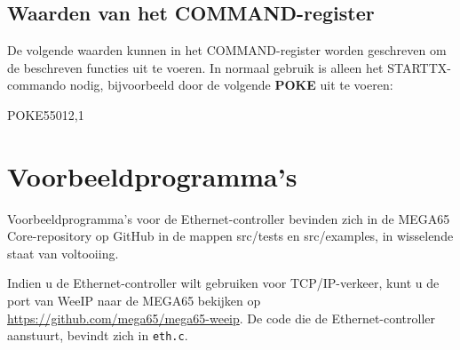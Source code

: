 \subsection{Waarden van het COMMAND-register}

De volgende waarden kunnen in het COMMAND-register worden geschreven om de beschreven functies uit te voeren. In normaal gebruik is alleen het STARTTX-commando nodig, bijvoorbeeld door de volgende {\bf POKE} uit te voeren:

\begin{screencode}
POKE55012,1
\end{screencode}



\section{Voorbeeldprogramma's}

Voorbeeldprogramma's voor de Ethernet-controller bevinden zich in de MEGA65 Core-repository op GitHub in de mappen src/tests en src/examples, in wisselende staat van voltooiing.

Indien u de Ethernet-controller wilt gebruiken voor TCP/IP-verkeer, kunt u de port van WeeIP naar de MEGA65 bekijken op \url{https://github.com/mega65/mega65-weeip}. De code die de Ethernet-controller aanstuurt, bevindt zich in {\tt eth.c}.

